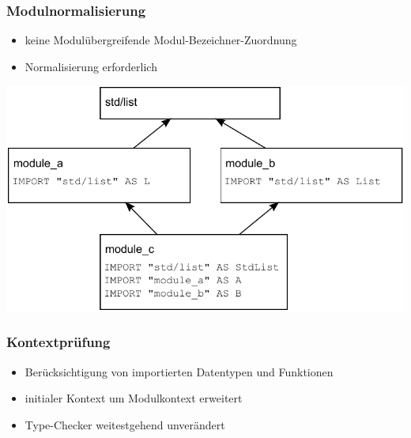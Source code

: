 \begin{frame}[containsverbatim=true]
\frametitle{Modulnormalisierung}

\begin{itemize}
\item keine Modulübergreifende Modul-Bezeichner-Zuordnung
\item Normalisierung erforderlich
\end{itemize}

\includegraphics[width=1\linewidth]{depsModABC}

\end{frame}


\begin{frame}
\frametitle{Kontextprüfung}

\begin{itemize}
\item Berücksichtigung von importierten Datentypen und Funktionen
\item initialer Kontext um Modulkontext erweitert
\item Type-Checker weitestgehend unverändert
\end{itemize}

\end{frame}
